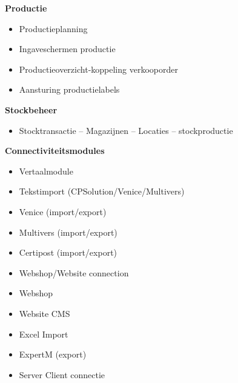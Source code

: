 \textbf{Productie}
\begin{itemize}
	\item Productieplanning
	\item Ingaveschermen productie
	\item Productieoverzicht-koppeling verkooporder
	\item Aansturing productielabels
\end{itemize}

\textbf{Stockbeheer}
\begin{itemize}
	\item Stocktransactie -- Magazijnen -- Locaties -- stockproductie
\end{itemize}

\textbf{Connectiviteitsmodules}
\begin{itemize}
	\item Vertaalmodule
	\item Tekstimport (CPSolution/Venice/Multivers)
	\item Venice (import/export)
	\item Multivers (import/export)
	\item Certipost (import/export)
	\item Webshop/Website connection
	\item Webshop
	\item Website CMS
	\item Excel Import
	\item ExpertM (export)
	\item Server Client connectie
\end{itemize}